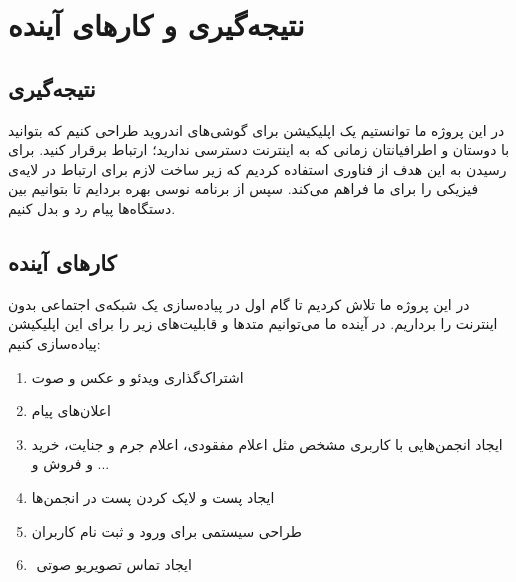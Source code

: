 \chapter{نتیجه‌گیری و کار‌های آینده}
\thispagestyle{empty}

\section{نتیجه‌گیری}
در این پروژه ما توانستیم یک اپلیکیشن برای گوشی‌های اندروید طراحی کنیم که بتوانید با دوستان و اطرافیانتان زمانی که به اینترنت دسترسی ندارید؛ ارتباط برقرار کنید. برای رسیدن به این هدف از فناوری
استفاده کردیم که زیر ساخت لازم برای ارتباط در لایه‌ی فیزیکی را برای ما فراهم می‌کند. سپس از برنامه نوسی 
بهره بردایم تا بتوانیم بین دستگاه‌ها پیام رد و بدل کنیم. 
\section{کار‌های آینده}
در این پروژه ما تلاش کردیم تا گام اول در پیاده‌سازی یک شبکه‌ی اجتماعی بدون اینترنت را برداریم. در آینده ما می‌توانیم متد‌ها و قابلیت‌های زیر را برای این اپلیکیشن پیاده‌سازی کنیم:
\begin{enumerate}
	\item اشتراک‌گذاری ویدئو و عکس و صوت
	\item اعلان‌های پیام
	\item ایجاد انجمن‌هایی 
	با کاربری مشخص مثل اعلام مفقودی، اعلام جرم و جنایت، خرید و فروش و ...
	\item ایجاد پست و لایک کردن پست در انجمن‌ها
	\item طراحی سیستمی برای ورود و ثبت نام کاربران 
	\item‌ ایجاد تماس تصویریو صوتی 
	
\end{enumerate}